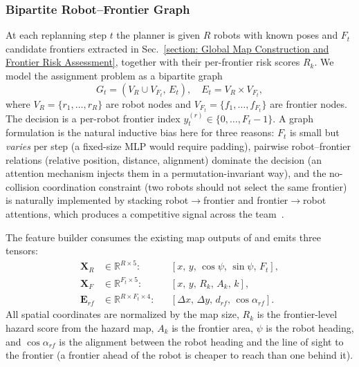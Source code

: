 \subsubsection{Bipartite Robot--Frontier Graph}
At each replanning step $t$ the planner is given $R$ robots with known poses and $F_t$ candidate frontiers extracted in Sec.~\ref{section: Global Map Construction and Frontier Risk Assessment}, together with their per-frontier risk scores $R_k$. We model the assignment problem as a bipartite graph
\begin{equation}
G_t = (V_R \cup V_{F_t},\, E_t),\quad E_t = V_R \times V_{F_t},
\end{equation}
where $V_R = \{r_1,\dots,r_R\}$ are robot nodes and $V_{F_t} = \{f_1,\dots,f_{F_t}\}$ are frontier nodes. The decision is a per-robot frontier index $y_t^{(r)}\in\{0,\dots,F_t-1\}$. A graph formulation is the natural inductive bias here for three reasons: $F_t$ is small but \emph{varies} per step (a fixed-size MLP would require padding), pairwise robot--frontier relations (relative position, distance, alignment) dominate the decision (an attention mechanism injects them in a permutation-invariant way), and the no-collision coordination constraint (two robots should not select the same frontier) is naturally implemented by stacking robot$\to$frontier and frontier$\to$robot attentions, which produces a competitive signal across the team~\cite{velickovic2018gat}.

The feature builder consumes the existing map outputs of \system and emits three tensors:
\begin{equation}
\begin{aligned}
\mathbf{X}_R &\in \mathbb{R}^{R\times 5}: && [x,\,y,\,\cos\psi,\,\sin\psi,\,F_t], \\
\mathbf{X}_F &\in \mathbb{R}^{F_t\times 5}: && [x,\,y,\,R_k,\,A_k,\,k], \\
\mathbf{E}_{rf} &\in \mathbb{R}^{R\times F_t\times 4}: && [\Delta x,\,\Delta y,\,d_{rf},\,\cos\alpha_{rf}].
\end{aligned}
\end{equation}
All spatial coordinates are normalized by the map size, $R_k$ is the frontier-level hazard score from the hazard map, $A_k$ is the frontier area, $\psi$ is the robot heading, and $\cos\alpha_{rf}$ is the alignment between the robot heading and the line of sight to the frontier (a frontier ahead of the robot is cheaper to reach than one behind it).

